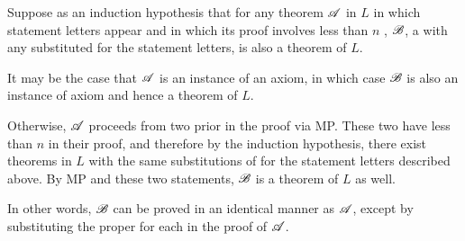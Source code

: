 \begin{enumerate}
    Suppose as an induction hypothesis that for any theorem \(\mathscr{A}\) in \(L\) in which statement letters appear and in which its proof involves less than \(n\) \wfs{}, \(\mathscr{B}\), a \wf{} with any \wfs{} substituted for the statement letters, is also a theorem of \(L\).

    It may be the case that \(\mathscr{A}\) is an instance of an axiom, in which case \(\mathscr{B}\) is also an instance of axiom and hence a theorem of \(L\).

    Otherwise, \(\mathscr{A}\) proceeds from two prior \wfs{} in the proof via MP. These two \wfs{} have less than \(n\) \wfs{} in their proof, and therefore by the induction hypothesis, there exist theorems in \(L\) with the same substitutions of \wfs{} for the statement letters described above. By MP and these two statements, \(\mathscr{B}\) is a theorem of \(L\) as well.

    \note{} In other words, \(\mathscr{B}\) can be proved in an identical manner as \(\mathscr{A}\), except by substituting the proper \wfs{} for each \wf{} in the proof of \(\mathscr{A}\).
\end{enumerate}
